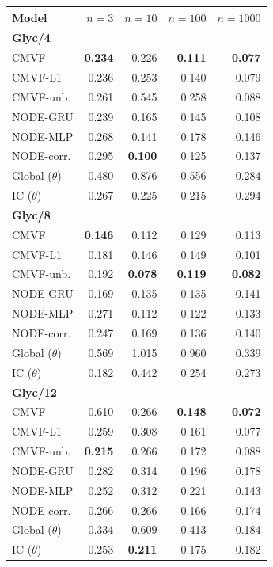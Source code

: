 \begin{tabular*}{\linewidth}{@{\extracolsep{\fill}}lrrrr}
\toprule
Model & $n=3$ & $n=10$ & $n=100$ & $n=1000$ \\
\midrule
\multicolumn{5}{l}{\textbf{Glyc/4}} \\
CMVF & \textbf{0.234} & 0.226 & \textbf{0.111} & \textbf{0.077} \\
CMVF-L1 & 0.236 & 0.253 & 0.140 & 0.079 \\
CMVF-unb. & 0.261 & 0.545 & 0.258 & 0.088 \\
NODE-GRU & 0.239 & 0.165 & 0.145 & 0.108 \\
NODE-MLP & 0.268 & 0.141 & 0.178 & 0.146 \\
NODE-corr. & 0.295 & \textbf{0.100} & 0.125 & 0.137 \\
Global ($\theta$) & 0.480 & 0.876 & 0.556 & 0.284 \\
IC ($\theta$) & 0.267 & 0.225 & 0.215 & 0.294 \\
\midrule
\multicolumn{5}{l}{\textbf{Glyc/8}} \\
CMVF & \textbf{0.146} & 0.112 & 0.129 & 0.113 \\
CMVF-L1 & 0.181 & 0.146 & 0.149 & 0.101 \\
CMVF-unb. & 0.192 & \textbf{0.078} & \textbf{0.119} & \textbf{0.082} \\
NODE-GRU & 0.169 & 0.135 & 0.135 & 0.141 \\
NODE-MLP & 0.271 & 0.112 & 0.122 & 0.133 \\
NODE-corr. & 0.247 & 0.169 & 0.136 & 0.140 \\
Global ($\theta$) & 0.569 & 1.015 & 0.960 & 0.339 \\
IC ($\theta$) & 0.182 & 0.442 & 0.254 & 0.273 \\
\midrule
\multicolumn{5}{l}{\textbf{Glyc/12}} \\
CMVF & 0.610 & 0.266 & \textbf{0.148} & \textbf{0.072} \\
CMVF-L1 & 0.259 & 0.308 & 0.161 & 0.077 \\
CMVF-unb. & \textbf{0.215} & 0.266 & 0.172 & 0.088 \\
NODE-GRU & 0.282 & 0.314 & 0.196 & 0.178 \\
NODE-MLP & 0.252 & 0.312 & 0.221 & 0.143 \\
NODE-corr. & 0.266 & 0.266 & 0.166 & 0.174 \\
Global ($\theta$) & 0.334 & 0.609 & 0.413 & 0.184 \\
IC ($\theta$) & 0.253 & \textbf{0.211} & 0.175 & 0.182 \\

\end{tabular*}

